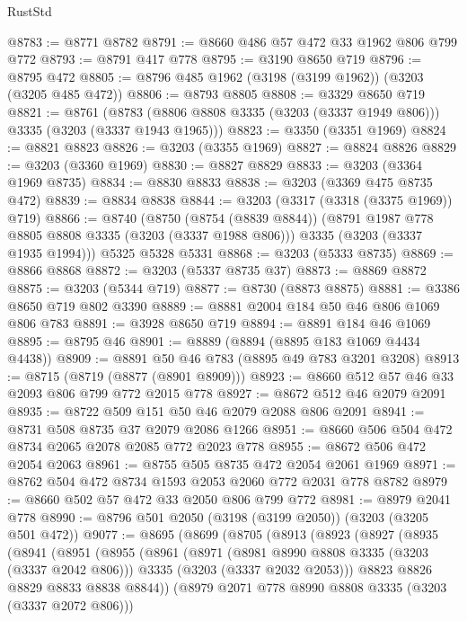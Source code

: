 \begin{lexlean}{RustStd}
\begin{coremodule}
{\begin{coremodule}
{{{{{{{{{{{{{{{@8783 := @8771 @8782
@8791 := @8660 @486 @57 @472 @33 @1962 @806 @799 @772
@8793 := @8791 @417 @778
@8795 := @3190 @8650 @719
@8796 := @8795 @472
@8805 := @8796 @485 @1962 (@3198 (@3199 @1962)) (@3203 (@3205 @485 @472))
@8806 := @8793 @8805
@8808 := @3329 @8650 @719
@8821 := @8761
    (@8783 (@8806 @8808 @3335 (@3203 (@3337 @1949 @806))) @3335 (@3203 (@3337 @1943 @1965)))
@8823 := @3350 (@3351 @1969)
@8824 := @8821 @8823
@8826 := @3203 (@3355 @1969)
@8827 := @8824 @8826
@8829 := @3203 (@3360 @1969)
@8830 := @8827 @8829
@8833 := @3203 (@3364 @1969 @8735)
@8834 := @8830 @8833
@8838 := @3203 (@3369 @475 @8735 @472)
@8839 := @8834 @8838
@8844 := @3203 (@3317 (@3318 (@3375 @1969)) @719)
@8866 := @8740
    (@8750
      (@8754 (@8839 @8844))
      (@8791 @1987 @778 @8805 @8808 @3335 (@3203 (@3337 @1988 @806)))
      @3335
      (@3203 (@3337 @1935 @1994)))
    @5325
    @5328
    @5331
@8868 := @3203 (@5333 @8735)
@8869 := @8866 @8868
@8872 := @3203 (@5337 @8735 @37)
@8873 := @8869 @8872
@8875 := @3203 (@5344 @719)
@8877 := @8730 (@8873 @8875)
@8881 := @3386 @8650 @719 @802 @3390
@8889 := @8881 @2004 @184 @50 @46 @806 @1069 @806 @783
@8891 := @3928 @8650 @719
@8894 := @8891 @184 @46 @1069
@8895 := @8795 @46
@8901 := @8889 (@8894 (@8895 @183 @1069 @4434 @4438))
@8909 := @8891 @50 @46 @783 (@8895 @49 @783 @3201 @3208)
@8913 := @8715 (@8719 (@8877 (@8901 @8909)))
@8923 := @8660 @512 @57 @46 @33 @2093 @806 @799 @772 @2015 @778
@8927 := @8672 @512 @46 @2079 @2091
@8935 := @8722 @509 @151 @50 @46 @2079 @2088 @806 @2091
@8941 := @8731 @508 @8735 @37 @2079 @2086 @1266
@8951 := @8660 @506 @504 @472 @8734 @2065 @2078 @2085 @772 @2023 @778
@8955 := @8672 @506 @472 @2054 @2063
@8961 := @8755 @505 @8735 @472 @2054 @2061 @1969
@8971 := @8762 @504 @472 @8734 @1593 @2053 @2060 @772 @2031 @778 @8782
@8979 := @8660 @502 @57 @472 @33 @2050 @806 @799 @772
@8981 := @8979 @2041 @778
@8990 := @8796 @501 @2050 (@3198 (@3199 @2050)) (@3203 (@3205 @501 @472))
@9077 := @8695
    (@8699
      (@8705
        (@8913
          (@8923
            (@8927
              (@8935
                (@8941
                  (@8951
                    (@8955
                      (@8961
                        (@8971
                          (@8981 @8990 @8808 @3335 (@3203 (@3337 @2042 @806)))
                          @3335
                          (@3203 (@3337 @2032 @2053)))
                        @8823
                        @8826
                        @8829
                        @8833
                        @8838
                        @8844))
                    (@8979 @2071 @778 @8990 @8808 @3335 (@3203 (@3337 @2072 @806)))
}}}}}}}}}}}}}}}
\end{coremodule}}
\end{coremodule}
\end{lexlean}

